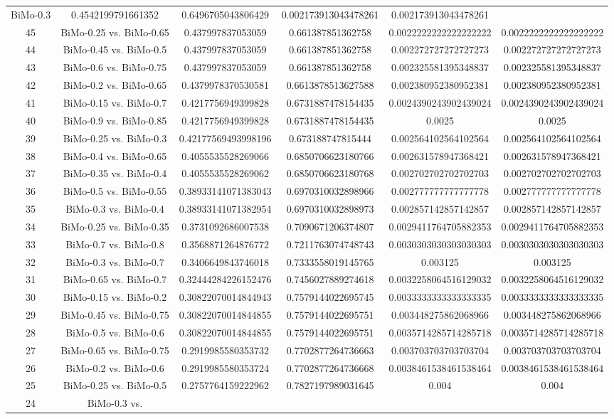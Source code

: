 \documentclass[a4paper,10pt]{article}
\begin{document}
\begin{landscape}
\begin{table}[!htp]
\begin{tabular}{cccccc}
BiMo-0.3&0.4542199791661352&0.6496705043806429&0.002173913043478261&0.002173913043478261\\45&BiMo-0.25 vs. BiMo-0.65&0.437997837053059&0.661387851362758&0.0022222222222222222&0.0022222222222222222\\44&BiMo-0.45 vs. BiMo-0.5&0.437997837053059&0.661387851362758&0.002272727272727273&0.002272727272727273\\43&BiMo-0.6 vs. BiMo-0.75&0.437997837053059&0.661387851362758&0.002325581395348837&0.002325581395348837\\42&BiMo-0.2 vs. BiMo-0.65&0.4379978370530581&0.6613878513627588&0.002380952380952381&0.002380952380952381\\41&BiMo-0.15 vs. BiMo-0.7&0.4217756949399828&0.6731887478154435&0.0024390243902439024&0.0024390243902439024\\40&BiMo-0.9 vs. BiMo-0.85&0.4217756949399828&0.6731887478154435&0.0025&0.0025\\39&BiMo-0.25 vs. BiMo-0.3&0.42177569493998196&0.673188747815444&0.002564102564102564&0.002564102564102564\\38&BiMo-0.4 vs. BiMo-0.65&0.4055535528269066&0.6850706623180766&0.002631578947368421&0.002631578947368421\\37&BiMo-0.35 vs. BiMo-0.4&0.4055535528269062&0.6850706623180768&0.002702702702702703&0.002702702702702703\\36&BiMo-0.5 vs. BiMo-0.55&0.38933141071383043&0.6970310032898966&0.002777777777777778&0.002777777777777778\\35&BiMo-0.3 vs. BiMo-0.4&0.38933141071382954&0.6970310032898973&0.002857142857142857&0.002857142857142857\\34&BiMo-0.25 vs. BiMo-0.35&0.3731092686007538&0.7090671206374807&0.0029411764705882353&0.0029411764705882353\\33&BiMo-0.7 vs. BiMo-0.8&0.3568871264876772&0.7211763074748743&0.0030303030303030303&0.0030303030303030303\\32&BiMo-0.3 vs. BiMo-0.7&0.3406649843746018&0.7333558019145765&0.003125&0.003125\\31&BiMo-0.65 vs. BiMo-0.7&0.32444284226152476&0.7456027889274618&0.0032258064516129032&0.0032258064516129032\\30&BiMo-0.15 vs. BiMo-0.2&0.30822070014844943&0.7579144022695745&0.0033333333333333335&0.0033333333333333335\\29&BiMo-0.45 vs. BiMo-0.75&0.30822070014844855&0.7579144022695751&0.003448275862068966&0.003448275862068966\\28&BiMo-0.5 vs. BiMo-0.6&0.30822070014844855&0.7579144022695751&0.0035714285714285718&0.0035714285714285718\\27&BiMo-0.65 vs. BiMo-0.75&0.2919985580353732&0.7702877264736663&0.003703703703703704&0.003703703703703704\\26&BiMo-0.2 vs. BiMo-0.6&0.2919985580353724&0.7702877264736668&0.0038461538461538464&0.0038461538461538464\\25&BiMo-0.25 vs. BiMo-0.5&0.2757764159222962&0.7827197989031645&0.004&0.004\\24&BiMo-0.3 vs. 
\end{tabular}
\end{table}
\end{landscape}
\end{document}
